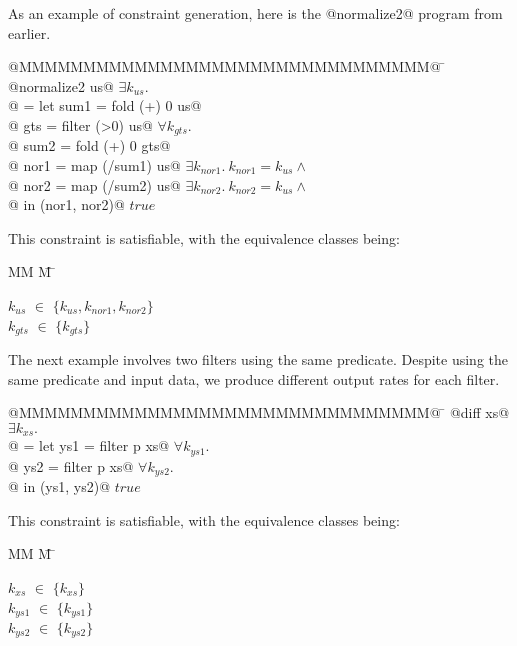 As an example of constraint generation, here is the @normalize2@ program from earlier.
\begin{tabbing}
@MMMMMMMMMMMMMMMMMMMMMMMMMMMMMMMM@  \= \kill
@normalize2 us@                     \> $\exists k_{us}.$      \\
@ = let sum1 = fold   (+) 0 us@     \>                      \\
@       gts  = filter (>0)  us@     \> $\forall k_{gts}.$ \\
@       sum2 = fold   (+) 0 gts@    \> \\
@       nor1 = map  (/sum1) us@     \> $\exists k_{nor1}.\ k_{nor1} = k_{us} \wedge$ \\
@       nor2 = map  (/sum2) us@     \> $\exists k_{nor2}.\ k_{nor2} = k_{us} \wedge$ \\
@   in (nor1, nor2)@                \> $true$ \\
\end{tabbing}
This constraint is satisfiable, with the equivalence classes being:
\newcommand{\eqclasses}[1]{
    \begin{tabbing}
        MM \= M \= \kill
        #1
    \end{tabbing}}
\newcommand{\eqclass}[2]{$#1$ \> $\in$ \> $\{#2\}$ \\}
\eqclasses{
    \eqclass{k_{us}}{k_{us}, k_{nor1}, k_{nor2}}
    \eqclass{k_{gts}}{k_{gts}}
}

The next example involves two filters using the same predicate.
Despite using the same predicate and input data, we produce different output rates for each filter.
\begin{tabbing}
@MMMMMMMMMMMMMMMMMMMMMMMMMMMMMMMM@  \= \kill
@diff xs@                           \> $\exists k_{xs}.$ \\
@ = let ys1 = filter p xs@          \> $\forall k_{ys1}.$       \\
@       ys2 = filter p xs@          \> $\forall k_{ys2}.$       \\
@   in (ys1, ys2)@                  \> $true$                   \\
\end{tabbing}

This constraint is satisfiable, with the equivalence classes being:
\eqclasses{
    \eqclass{k_{xs}}    {k_{xs}}
    \eqclass{k_{ys1}}   {k_{ys1}}
    \eqclass{k_{ys2}}   {k_{ys2}}
}


